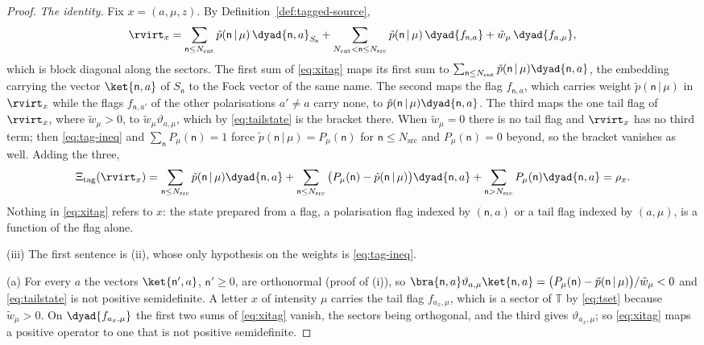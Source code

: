 \begin{proof}
\emph{The identity.} Fix $x=(a,\mu,z)$. By Definition~\ref{def:tagged-source},
\begin{equation*}
  \rvirt_x=\sum_{\mathsf{n}\le N_{\mathrm{ent}}}
  \tilde p(\mathsf{n}\,|\,\mu)\,\dyad{\mathsf{n},a}_{S_{\mathsf{n}}}
  +\sum_{N_{\mathrm{ent}}<\mathsf{n}\le N_{\mathrm{src}}}
  \tilde p(\mathsf{n}\,|\,\mu)\,\dyad{f_{\mathsf{n},a}}
  +\tilde w_\mu\,\dyad{f_{a,\mu}} ,
\end{equation*}
which is block diagonal along the sectors. The first sum of \eqref{eq:xitag}
maps its first sum to $\sum_{\mathsf{n}\le N_{\mathrm{ent}}}
\tilde p(\mathsf{n}\,|\,\mu)\dyad{\mathsf{n},a}$, the embedding carrying the
vector $\ket{\mathsf{n},a}$ of $S_{\mathsf{n}}$ to the Fock vector of the same
name. The second maps the flag $f_{\mathsf{n},a}$, which carries weight
$\tilde p(\mathsf{n}\,|\,\mu)$ in $\rvirt_x$ while the flags
$f_{\mathsf{n},a'}$ of the other polarisations $a'\ne a$ carry none, to
$\tilde p(\mathsf{n}\,|\,\mu)\dyad{\mathsf{n},a}$.
The third maps the one tail flag of $\rvirt_x$, where $\tilde w_\mu>0$, to
$\tilde w_\mu\vartheta_{a,\mu}$, which by \eqref{eq:tailstate} is the bracket
there. When $\tilde w_\mu=0$ there is no tail flag and $\rvirt_x$ has no third
term; then \eqref{eq:tag-ineq} and $\sum_{\mathsf{n}}P_\mu(\mathsf{n})=1$ force
$\tilde p(\mathsf{n}\,|\,\mu)=P_\mu(\mathsf{n})$ for
$\mathsf{n}\le N_{\mathrm{src}}$ and $P_\mu(\mathsf{n})=0$ beyond, so the
bracket vanishes as well. Adding the three,
\begin{equation*}
  \Xi_{\mathrm{tag}}(\rvirt_x)
  =\sum_{\mathsf{n}\le N_{\mathrm{src}}}\tilde p(\mathsf{n}\,|\,\mu)
   \dyad{\mathsf{n},a}
  +\sum_{\mathsf{n}\le N_{\mathrm{src}}}
   \big(P_\mu(\mathsf{n})-\tilde p(\mathsf{n}\,|\,\mu)\big)\dyad{\mathsf{n},a}
  +\sum_{\mathsf{n}>N_{\mathrm{src}}}P_\mu(\mathsf{n})\dyad{\mathsf{n},a}
  =\rho_x .
\end{equation*}
Nothing in \eqref{eq:xitag} refers to $x$: the state prepared from a flag, a
polarisation flag indexed by $(\mathsf{n},a)$ or a tail flag indexed by
$(a,\mu)$, is a function of the flag alone.

(iii) The first sentence is (ii), whose only hypothesis on the weights is
\eqref{eq:tag-ineq}.

(a) For every $a$ the vectors $\ket{\mathsf{n}',a}$, $\mathsf{n}'\ge0$, are
orthonormal (proof of (i)), so
$\bra{\mathsf{n},a}\vartheta_{a,\mu}\ket{\mathsf{n},a}
=\big(P_\mu(\mathsf{n})-\tilde p(\mathsf{n}\,|\,\mu)\big)/\tilde w_\mu<0$ and
\eqref{eq:tailstate} is not positive semidefinite. A letter $x$ of intensity
$\mu$ carries the tail flag $f_{a_x,\mu}$, which is a sector of $\mathbb{T}$ by
\eqref{eq:tset} because $\tilde w_\mu>0$. On $\dyad{f_{a_x,\mu}}$ the first two
sums of \eqref{eq:xitag} vanish, the sectors being orthogonal, and the third
gives $\vartheta_{a_x,\mu}$; so \eqref{eq:xitag} maps a positive operator to
one that is not positive semidefinite.


\end{proof}
